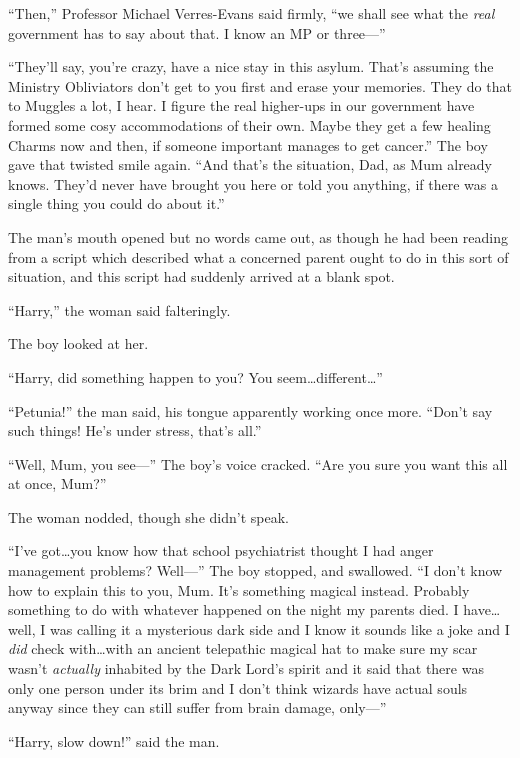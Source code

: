 “Then,” Professor Michael Verres-Evans said firmly, “we shall see what the \emph{real} government has to say about that. I know an MP or three—”

“They’ll say, you’re crazy, have a nice stay in this asylum. That’s assuming the Ministry Obliviators don’t get to you first and erase your memories. They do that to Muggles a lot, I hear. I figure the real higher-ups in our government have formed some cosy accommodations of their own. Maybe they get a few healing Charms now and then, if someone important manages to get cancer.” The boy gave that twisted smile again. “And that’s the situation, Dad, as Mum already knows. They’d never have brought you here or told you anything, if there was a single thing you could do about it.”

The man’s mouth opened but no words came out, as though he had been reading from a script which described what a concerned parent ought to do in this sort of situation, and this script had suddenly arrived at a blank spot.

“Harry,” the woman said falteringly.

The boy looked at her.

“Harry, did something happen to you? You seem…different…”

“Petunia!” the man said, his tongue apparently working once more. “Don’t say such things! He’s under stress, that’s all.”

“Well, Mum, you see—” The boy’s voice cracked. “Are you sure you want this all at once, Mum?”

The woman nodded, though she didn’t speak.

“I’ve got…you know how that school psychiatrist thought I had anger management problems? Well—” The boy stopped, and swallowed. “I don’t know how to explain this to you, Mum. It’s something magical instead. Probably something to do with whatever happened on the night my parents died. I have…well, I was calling it a mysterious dark side and I know it sounds like a joke and I \emph{did} check with…with an ancient telepathic magical hat to make sure my scar wasn’t \emph{actually} inhabited by the Dark Lord’s spirit and it said that there was only one person under its brim and I don’t think wizards have actual souls anyway since they can still suffer from brain damage, only—”

“Harry, slow down!” said the man.

